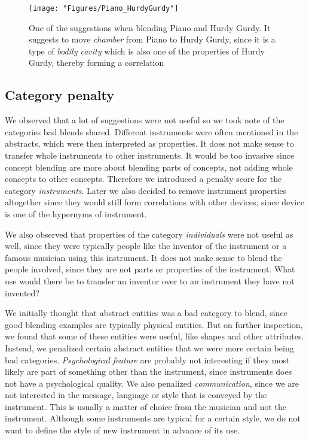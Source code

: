 \begin{figure}
	\centering
	\texttt{[image: "Figures/Piano\_HurdyGurdy"]}
	\caption{One of the suggestions when blending Piano and Hurdy Gurdy. It suggests to move \emph{chamber} from Piano to Hurdy Gurdy, since it is a type of \emph{bodily cavity} which is also one of the properties of Hurdy Gurdy, thereby forming a correlation }
	\label{fig:hurdy-gurdy}
\end{figure}

\subsection{Category penalty}
We observed that a lot of suggestions were not useful so we took note of the categories bad blends shared. Different instruments were often mentioned in the abstracts, which were then interpreted as properties. It does not make sense to transfer whole instruments to other instruments. It would be too invasive since concept blending are more about blending parts of concepts, not adding whole concepts to other concepts. Therefore we introduced a penalty score for the category \emph{instruments}. Later we also decided to remove instrument properties altogether since they would still form correlations with other devices, since device is one of the hypernyms of instrument.

We also observed that properties of the category \emph{individuals} were not useful as well, since they were typically people like the inventor of the instrument or a famous musician using this instrument. It does not make sense to blend the people involved, since they are not parts or properties of the instrument. What use would there be to transfer an inventor over to an instrument they have not invented?

We initially thought that abstract entities was a bad category to blend, since good blending examples are typically physical entities. But on further inspection, we found that some of these entities were useful, like shapes and other attributes. Instead, we penalized certain abstract entities that we were more certain being bad categories. \emph{Psychological feature} are probably not interesting if they most likely are part of something other than the instrument, since instruments does not have a psychological quality. We also penalized \emph{communication}, since we are not interested in the message, language or style that is conveyed by the instrument. This is usually a matter of choice from the musician and not the instrument. Although some instruments are typical for a certain style, we do not want to define the style of new instrument in advance of its use.

